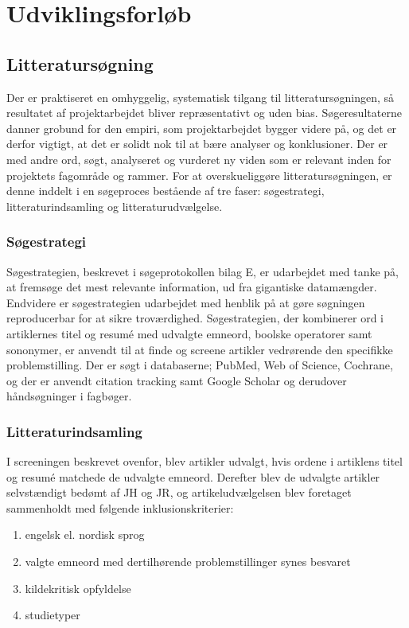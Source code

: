 \chapter{Udviklingsforløb}

\section{Litteratursøgning}
 Der er praktiseret en omhyggelig, systematisk tilgang til litteratursøgningen, så resultatet af projektarbejdet bliver repræsentativt og uden bias. Søgeresultaterne danner grobund for den empiri, som projektarbejdet bygger videre på, og det er derfor vigtigt, at det er solidt nok til at bære analyser og konklusioner. Der er med andre ord, søgt, analyseret og vurderet ny viden som er relevant inden for projektets fagområde og rammer. For at overskueliggøre litteratursøgningen, er denne inddelt i en søgeproces bestående af tre faser: søgestrategi, litteraturindsamling og litteraturudvælgelse. 
 
	\subsection{Søgestrategi}
	Søgestrategien, beskrevet i søgeprotokollen bilag E, er udarbejdet med tanke på, at fremsøge det mest relevante information, ud fra gigantiske datamængder. Endvidere er søgestrategien udarbejdet med henblik på at gøre søgningen reproducerbar for at sikre troværdighed.  
	Søgestrategien, der kombinerer ord i artiklernes titel og resumé med udvalgte emneord, boolske operatorer samt sononymer, er anvendt til at finde og screene artikler vedrørende den specifikke problemstilling. Der er søgt i databaserne; PubMed, Web of Science, Cochrane, og der er anvendt citation tracking samt Google Scholar og derudover håndsøgninger i fagbøger.  
	
	\subsection{Litteraturindsamling}
	I screeningen beskrevet ovenfor, blev artikler udvalgt, hvis ordene i artiklens titel og resumé matchede de udvalgte emneord. Derefter blev de udvalgte artikler selvstændigt bedømt af JH og JR, og artikeludvælgelsen blev foretaget sammenholdt med følgende inklusionskriterier:
	
		\begin{enumerate}
			\item engelsk el. nordisk sprog 
			\item valgte emneord med dertilhørende problemstillinger synes besvaret
			\item kildekritisk opfyldelse
			\item studietyper
		\end{enumerate} 
		
